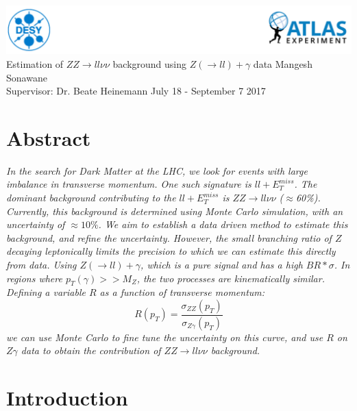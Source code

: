 \documentclass[11pt,a4paper,final]{report}
\begin{document}
\begin{titlepage}
\centering
\vfill
\vfill
\includegraphics[width = \linewidth]{Title_Head.png}
\vspace{1 in}\\
{\huge Estimation of $ZZ \rightarrow ll\nu\nu$ background using $Z(\rightarrow ll)+\gamma$ data}
\vfill
{\LARGE Mangesh Sonawane \\ Supervisor: Dr. Beate Heinemann}
\vfill
{\LARGE July 18 - September 7 2017}
\vfill
\vfill
\end{titlepage}
\tableofcontents
\newpage
\section*{Abstract}
\textit{
In the search for Dark Matter at the LHC, we look for events with large imbalance in transverse momentum. One such signature is $ll + E_T^{miss}$. The dominant background contributing to the $ll + E_T^{miss}$ is $ZZ \rightarrow ll\nu\nu$ ($\approx$60\%).  Currently, this background is determined using Monte Carlo simulation, with an uncertainty of $\approx 10\%$. We aim to establish a data driven method to estimate this background, and refine the uncertainty. However, the small branching ratio of $Z$ decaying leptonically limits the precision to which we can estimate this directly from data. Using $Z(\rightarrow ll)+\gamma$, which is a pure signal and has a high $BR*\sigma$. In regions where $p_{T}(\gamma) >> M_{Z}$, the two processes are kinematically similar.
Defining a variable $R$ as a function of transverse momentum:
\begin{equation*}
	R(p_{T}) = \frac{\sigma_{ZZ}(p_{T})}{\sigma_{Z\gamma}(p_T)}
\end{equation*}
we can use Monte Carlo to fine tune the uncertainty on this curve, and use $R$ on $Z\gamma$ data to obtain the contribution of $ZZ \rightarrow ll\nu\nu$ background.
}

\section{Introduction}
\end{document}
